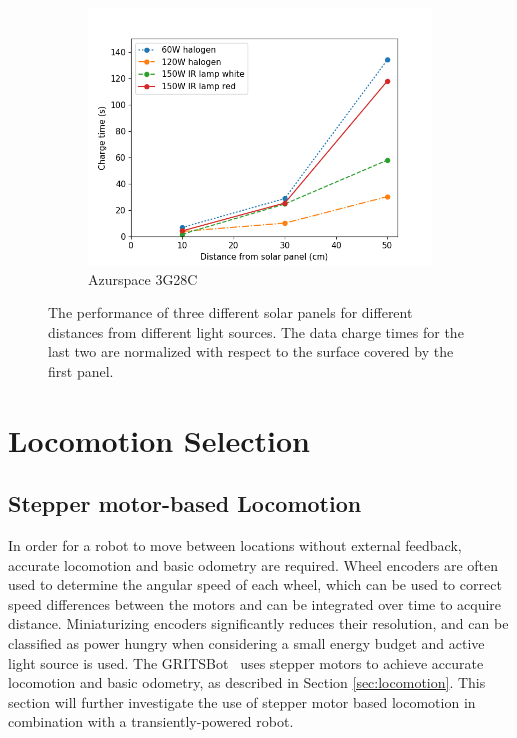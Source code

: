 \begin{figure}
\begin{subfigure}[b]{0.62\textwidth}
		\includegraphics[width=\textwidth]{pics/light_experiment_figure3.png}
		\caption{Azurspace 3G28C}
		\label{fig:light_exp3}
	\end{subfigure}
	\caption{The performance of three different solar panels for different distances from different light sources. The data charge times for the last two are normalized with respect to the surface covered by the first panel.}
\end{figure}

\section{Locomotion Selection}

\subsection{Stepper motor-based Locomotion}

In order for a robot to move between locations without external feedback, accurate locomotion and basic odometry are required.
Wheel encoders are often used to determine the angular speed of each wheel, which can be used to correct speed differences between the motors and can be integrated over time to acquire distance.
Miniaturizing encoders significantly reduces their resolution, and can be classified as power hungry when considering a small energy budget and active light source is used.
The GRITSBot~\cite{pickem_icra_2015} uses stepper motors to achieve accurate locomotion and basic odometry, as described in Section \ref{sec:locomotion}.
This section will further investigate the use of stepper motor based locomotion in combination with a transiently-powered robot.

